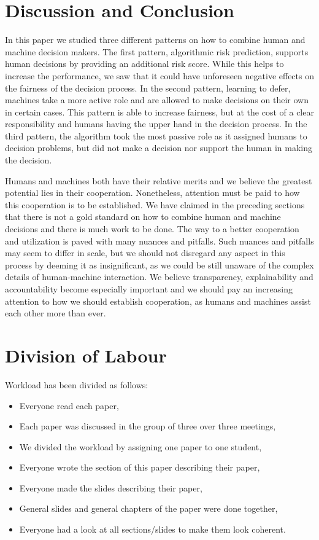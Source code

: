 \documentclass[11pt,a4paper,final]{article}
\begin{document}
\section{Discussion and Conclusion}
\label{sec:conclusion}
In this paper we studied three different patterns on how to combine human and machine decision makers. The first pattern, algorithmic risk prediction, supports human decisions by providing an additional risk score. While this helps to increase the performance, we saw that it could have unforeseen negative effects on the fairness of the decision process. In the second pattern, learning to defer, machines take a more active role and are allowed to make decisions on their own in certain cases. This pattern is able to increase fairness, but at the cost of a clear responsibility and humans having the upper hand in the decision process. In the third pattern, the algorithm took the most passive role as it assigned humans to decision problems, but did not make a decision nor support the human in making the decision.

Humans and machines both have their relative merits and we believe the greatest potential lies in their cooperation. Nonetheless, attention must be paid to how this cooperation is to be established. We have claimed in the preceding sections that there is not a gold standard on how to combine human and machine decisions and there is much work to be done. The way to a better cooperation and utilization is paved with many nuances and pitfalls. Such nuances and pitfalls may seem to differ in scale, but we should not disregard any aspect in this process by deeming it as insignificant, as we could be still unaware of the complex details of human-machine interaction. We believe transparency, explainability and accountability become especially important and we should pay an increasing attention to how we should establish cooperation, as humans and machines assist each other more than ever.


\section*{Division of Labour}

Workload has been divided as follows: 
\begin{itemize}
    \item Everyone read each paper,
    \item Each paper was discussed in the group of three over three meetings,
    \item We divided the workload by assigning one paper to one student, 
    \item Everyone wrote the section of this paper describing their paper,
    \item Everyone made the slides describing their paper,
    \item General slides and general chapters of the paper were done together,
    \item Everyone had a look at all sections/slides to make them look coherent.
\end{itemize}



\end{document}
